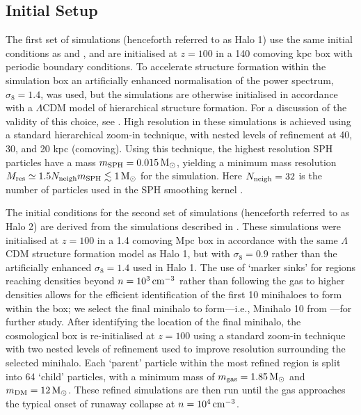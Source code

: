 \documentclass[usenatbib]{mn2e}
\newcommand{\cc}{\,{\rm cm}^{-3}}
\newcommand{\msun}{\,{\rm M}_{\odot}}
\begin{document}
\subsection{Initial Setup}
\label{setup}
The first set of simulations (henceforth referred to as Halo 1) use the same initial conditions as \citet{Hummeletal2015} and \citet{StacyGreifBromm2010}, and are initialised at $z=100$ in a 140 comoving kpc box with periodic boundary conditions. 
To accelerate structure formation within the simulation box an artificially enhanced normalisation of the power spectrum, $\sigma_8 = 1.4$, was used, but the simulations are otherwise initialised in accordance with a $\Lambda$CDM model of hierarchical structure formation. 
For a discussion of the validity of this choice, see \citet{StacyGreifBromm2010}. 
High resolution in these simulations is achieved using a standard hierarchical zoom-in technique, with nested levels of refinement at 40, 30, and 20 kpc (comoving).  
Using this technique, the highest resolution SPH particles have a mass $m_{\rm SPH} = 0.015\msun$, yielding a minimum mass resolution $M_{\rm res} \simeq 1.5 N_{\rm neigh} m_{\rm SPH} \lesssim 1\msun$ for the simulation.  
Here $N_{\rm neigh} = 32$ is the number of particles used in the SPH smoothing kernel \citep{BateBurkert1997}.

The initial conditions for the second set of simulations (henceforth referred to as Halo 2) are derived from the simulations described in \citet{StacyBromm2013}.  
These simulations were initialised at $z=100$ in a 1.4 comoving Mpc box in accordance with the same $\Lambda$CDM structure formation model as Halo 1, but with $\sigma_8 = 0.9$ rather than the artificially enhanced $\sigma_8 = 1.4$ used in Halo 1. 
The use of `marker sinks'  for regions reaching densities beyond $n=10^3\,{\rm cm}^{-3}$ rather than following the gas to higher densities allows for the efficient identification of the first 10 minihaloes to form within the box; we select the final minihalo to form---i.e., Minihalo 10 from \citet{StacyBromm2013}---for further study.  
After identifying the location of the final minihalo, the cosmological box is re-initialised at $z=100$ using a standard zoom-in technique with two nested levels of refinement used to improve resolution surrounding the selected minihalo.  
Each `parent' particle within the most refined region is split into 64 `child' particles, with a minimum mass of $m_{\rm gas}=1.85\msun$ and $m_{\rm \small DM}=12\msun$. 
These refined simulations are then run until the gas approaches the typical onset of runaway collapse at $n=10^4\cc$.
\end{document}
